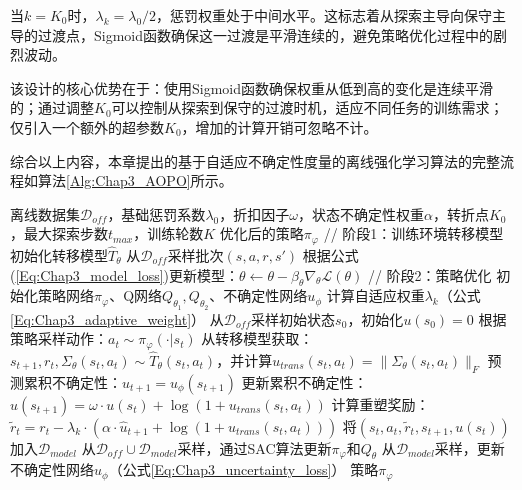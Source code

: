 当$k = K_0$时，$\lambda_k = \lambda_0 / 2$，惩罚权重处于中间水平。这标志着从探索主导向保守主导的过渡点，Sigmoid函数确保这一过渡是平滑连续的，避免策略优化过程中的剧烈波动。

该设计的核心优势在于：使用Sigmoid函数确保权重从低到高的变化是连续平滑的；通过调整$K_0$可以控制从探索到保守的过渡时机，适应不同任务的训练需求；仅引入一个额外的超参数$K_0$，增加的计算开销可忽略不计。

综合以上内容，本章提出的基于自适应不确定性度量的离线强化学习算法的完整流程如算法\ref{Alg:Chap3_AOPO}所示。

\begin{algorithm}[htbp]
  \caption{基于自适应不确定性度量的离线强化学习算法}
  \label{Alg:Chap3_AOPO}
  \begin{algorithmic}[1]
    \Require 离线数据集$\mathcal{D}_{off}$，基础惩罚系数$\lambda_0$，折扣因子$\omega$，状态不确定性权重$\alpha$，转折点$K_0$，最大探索步数$t_{max}$，训练轮数$K$
    \Ensure 优化后的策略$\pi_\varphi$
    \State // 阶段1：训练环境转移模型
    \State 初始化转移模型$\hat{T}_\theta$
    \State 从$\mathcal{D}_{off}$采样批次$(s, a, r, s')$
    \State 根据公式(\ref{Eq:Chap3_model_loss})更新模型：$\theta \leftarrow \theta - \beta_\theta \nabla_\theta \mathcal{L}(\theta)$
    \EndWhile
    \State // 阶段2：策略优化
    \State 初始化策略网络$\pi_\varphi$、Q网络$Q_{\theta_1}, Q_{\theta_2}$、不确定性网络$u_\phi$
    \State 计算自适应权重$\lambda_k$（公式\ref{Eq:Chap3_adaptive_weight}）
    \State 从$\mathcal{D}_{off}$采样初始状态$s_0$，初始化$u(s_0) = 0$
    \State 根据策略采样动作：$a_t \sim \pi_\varphi(\cdot|s_t)$
    \State 从转移模型获取：$s_{t+1}, r_t, \Sigma_\theta(s_t, a_t) \sim \hat{T}_\theta(s_t, a_t)$，并计算$u_{trans}(s_t, a_t) = \|\Sigma_\theta(s_t, a_t)\|_F$
    \State 预测累积不确定性：$\hat{u}_{t+1} = u_\phi(s_{t+1})$
    \State 更新累积不确定性：$u(s_{t+1}) = \omega \cdot u(s_t) + \log(1 + u_{trans}(s_t, a_t))$
    \State 计算重塑奖励：$\tilde{r}_t = r_t - \lambda_k \cdot (\alpha \cdot \hat{u}_{t+1} + \log(1 + u_{trans}(s_t, a_t)))$
    \State 将$(s_t, a_t, \tilde{r}_t, s_{t+1}, u(s_t))$加入$\mathcal{D}_{model}$
    \EndFor
    \State 从$\mathcal{D}_{off} \cup \mathcal{D}_{model}$采样，通过SAC算法更新$\pi_\varphi$和$Q_\theta$
    \State 从$\mathcal{D}_{model}$采样，更新不确定性网络$u_\phi$（公式\ref{Eq:Chap3_uncertainty_loss}）
    \EndFor
    \State \Return 策略$\pi_\varphi$
  \end{algorithmic}
\end{algorithm}

